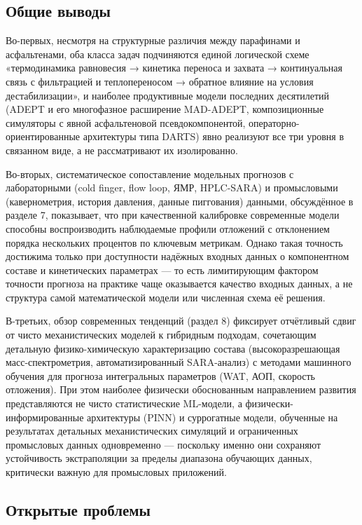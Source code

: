 \documentclass[11pt]{extarticle}
\begin{document}
\subsection{Общие выводы}\label{ux43eux431ux449ux438ux435-ux432ux44bux432ux43eux434ux44b}

Во-первых, несмотря на структурные различия между парафинами и асфальтенами, оба класса задач подчиняются единой логической схеме «термодинамика равновесия → кинетика переноса и захвата → континуальная связь с фильтрацией и теплопереносом → обратное влияние на условия дестабилизации», и наиболее продуктивные модели последних десятилетий (ADEPT и его многофазное расширение MAD-ADEPT, композиционные симуляторы с явной асфальтеновой псевдокомпонентой, операторно-ориентированные архитектуры типа DARTS) явно реализуют все три уровня в связанном виде, а не рассматривают их изолированно.

Во-вторых, систематическое сопоставление модельных прогнозов с лабораторными (cold finger, flow loop, ЯМР, HPLC-SARA) и промысловыми (кавернометрия, история давления, данные пиггования) данными, обсуждённое в разделе 7, показывает, что при качественной калибровке современные модели способны воспроизводить наблюдаемые профили отложений с отклонением порядка нескольких процентов по ключевым метрикам. Однако такая точность достижима только при доступности надёжных входных данных о компонентном составе и кинетических параметрах --- то есть лимитирующим фактором точности прогноза на практике чаще оказывается качество входных данных, а не структура самой математической модели или численная схема её решения.

В-третьих, обзор современных тенденций (раздел 8) фиксирует отчётливый сдвиг от чисто механистических моделей к гибридным подходам, сочетающим детальную физико-химическую характеризацию состава (высокоразрешающая масс-спектрометрия, автоматизированный SARA-анализ) с методами машинного обучения для прогноза интегральных параметров (WAT, АОП, скорость отложения). При этом наиболее физически обоснованным направлением развития представляются не чисто статистические ML-модели, а физически-информированные архитектуры (PINN) и суррогатные модели, обученные на результатах детальных механистических симуляций и ограниченных промысловых данных одновременно --- поскольку именно они сохраняют устойчивость экстраполяции за пределы диапазона обучающих данных, критически важную для промысловых приложений.

\subsection{Открытые проблемы}\label{ux43eux442ux43aux440ux44bux442ux44bux435-ux43fux440ux43eux431ux43bux435ux43cux44b}
\end{document}
